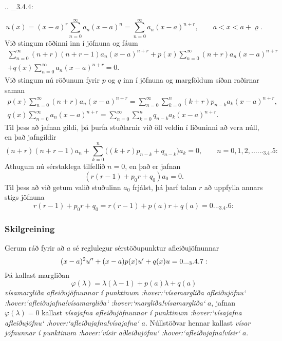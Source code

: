 .. _3.4.4:

\begin{equation*}u(x)= (x-a)^r\sum_{n=0}^\infty a_n(x-a)^n=
\sum_{n=0}^\infty a_n(x-a)^{n+r}, \qquad a<x<a+\varrho.
\end{equation*}
Við stingum röðinni inn í jöfnuna og fáum 
\begin{multline*}
\sum_{n=0}^\infty (n+r)(n+r-1)a_n(x-a)^{n+r} +
p(x)\sum_{n=0}^\infty (n+r)a_n(x-a)^{n+r} \\
+ q(x)\sum_{n=0}^\infty a_n(x-a)^{n+r} = 0.
\end{multline*}
Við stingum nú röðunum fyrir $p$ og $q$ inn í jöfnuna og 
margföldum síðan raðirnar saman 
\begin{gather*}
p(x)\sum_{n=0}^\infty (n+r)a_n(x-a)^{n+r}= \sum_{n=0}^\infty
\sum_{k=0}^n(k+r)p_{n-k}a_{k} (x-a)^{n+r},\\
q(x)\sum_{n=0}^\infty a_n(x-a)^{n+r}= \sum_{n=0}^\infty
\sum_{k=0}^n q_{n-k}a_{k} (x-a)^{n+r}.
\end{gather*}
Til þess að jafnan gildi, þá þurfa stuðlarnir við öll veldin í
liðuninni að vera núll, en það jafngildir
 \begin{equation*}(n+r)(n+r-1)a_n+\sum_{k=0}^n\big((k+r)p_{n-k}+q_{n-k}\big)a_k=0,
\qquad n=0,1,2,\dots.


.. _3.4.5:

 \end{equation*}
Athugum nú sérstaklega tilfellið $n=0$, en það er jafnan
 $$(r(r-1)+p_0r+q_0)a_0=0.
 $$
Til þess að við getum valið stuðulinn $a_0$ frjálst, þá þarf talan
$r$ að uppfylla annars stigs jöfnuna
 \begin{equation*}r(r-1)+p_0r+q_0=r(r-1)+ p(a)r+q(a)=0.


.. _3.4.6:

 \end{equation*}
\subsubsection{Skilgreining}
Gerum ráð fyrir að $a$ sé reglulegur sérstöðupunktur afleiðujöfnunnar
 \begin{equation*}(x-a)^2u\ddash+(x-a)p(x)u\dash+q(x)u=0.

.. _3.4.7:

 \end{equation*}
Þá kallast margliðan 
 $$\varphi(\lambda)=\lambda(\lambda-1)+p(a)\lambda+q(a)
 $$
{\it vísamargliða afleiðujöfnunnar í punktinum :hover:`vísamargliða
afleiðujöfnu` :hover:`afleiðujafna!vísamargliða` :hover:`margliða!vísamargliða`}
$a$, jafnan $\varphi(\lambda)=0$ kallast {\it vísajafna afleiðujöfnunnar í
punktinum :hover:`vísajafna afleiðujöfnu` :hover:`afleiðujafna!vísajafna`}
$a$. Núllstöðvar hennar kallast {\it vísar jöfnunnar í
punktinum :hover:`vísir aðleiðujöfnu` :hover:`afleiðujafna!vísir`} $a$.


